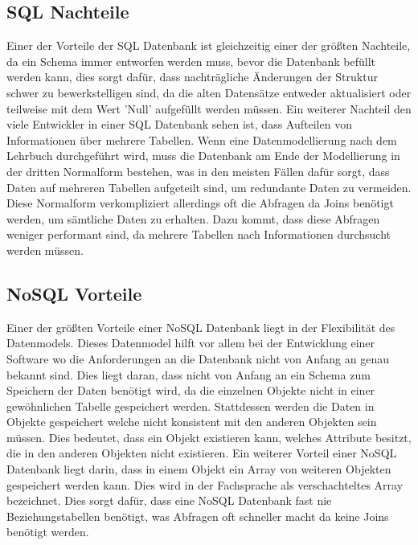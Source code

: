 \subsection{SQL Nachteile}
Einer der Vorteile der SQL Datenbank ist gleichzeitig einer der größten Nachteile, da ein Schema immer entworfen werden muss, bevor die Datenbank befüllt werden kann, dies sorgt dafür, dass nachträgliche Änderungen der Struktur schwer zu bewerkstelligen sind, da die alten Datensätze entweder aktualisiert oder teilweise mit dem Wert 'Null' aufgefüllt werden müssen. 
Ein weiterer Nachteil den viele Entwickler in einer SQL Datenbank sehen ist, dass Aufteilen von Informationen über mehrere Tabellen. 
Wenn eine Datenmodellierung nach dem Lehrbuch durchgeführt wird, muss die Datenbank am Ende der Modellierung in der dritten Normalform bestehen, was in den meisten Fällen dafür sorgt, dass Daten auf mehreren Tabellen aufgeteilt sind, um redundante Daten zu vermeiden. 
Diese Normalform verkompliziert allerdings oft die Abfragen da Joins benötigt werden, um sämtliche Daten zu erhalten. 
Dazu kommt, dass diese Abfragen weniger performant sind, da mehrere Tabellen nach Informationen durchsucht werden müssen. 
\newpage
\subsection{NoSQL Vorteile}
Einer der größten Vorteile einer NoSQL Datenbank liegt in der Flexibilität des Datenmodels. 
Dieses Datenmodel hilft vor allem bei der Entwicklung einer Software wo die Anforderungen an die Datenbank nicht von Anfang an genau bekannt sind. 
Dies liegt daran, dass nicht von Anfang an ein Schema zum Speichern der Daten benötigt wird, da die einzelnen Objekte nicht in einer gewöhnlichen Tabelle gespeichert werden.
Stattdessen werden die Daten in Objekte gespeichert welche nicht konsistent mit den anderen Objekten sein müssen. 
Dies bedeutet, dass ein Objekt existieren kann, welches Attribute besitzt, die in den anderen Objekten nicht existieren. 
Ein weiterer Vorteil einer NoSQL Datenbank liegt darin, dass in einem Objekt ein Array von weiteren Objekten gespeichert werden kann. 
Dies wird in der Fachsprache als verschachteltes Array bezeichnet. 
Dies sorgt dafür, dass eine NoSQL Datenbank fast nie Beziehungstabellen benötigt, was Abfragen oft schneller macht da keine Joins benötigt werden. 
